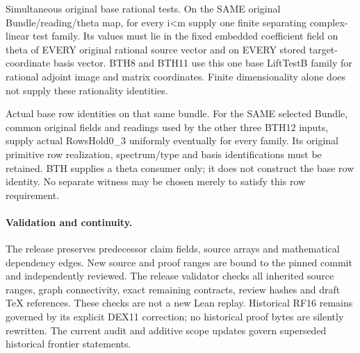 \begin{description}[style=nextline]
\item[34. BASE\_THETA\_RATIONAL\_TESTS --- C] Simultaneous original base rational tests. On the SAME original Bundle/reading/theta map, for every i<m supply one finite separating complex-linear test family. Its values must lie in the fixed embedded coefficient field on theta of EVERY original rational source vector and on EVERY stored target-coordinate basis vector. BTH8 and BTH11 use this one base LiftTestB family for rational adjoint image and matrix coordinates. Finite dimensionality alone does not supply these rationality identities.

\item[35. SLR\_BASE\_ROWS\_PRODUCER --- C] Actual base row identities on that same bundle. For the SAME selected Bundle, common original fields and readings used by the other three BTH12 inputs, supply actual RowsHold0\_3 uniformly eventually for every family. Its original primitive row realization, spectrum/type and basis identifications must be retained. BTH supplies a theta consumer only; it does not construct the base row identity. No separate witness may be chosen merely to satisfy this row requirement.

\end{description}

\paragraph{Validation and continuity.}
The release preserves predecessor claim fields, source arrays and
mathematical dependency edges. New source and proof ranges are bound
to the pinned commit and independently reviewed. The release
validator checks all inherited source ranges, graph connectivity,
exact remaining contracts, review hashes and draft TeX references.
These checks are not a new Lean replay. Historical RF16 remains
governed by its explicit DEX11 correction; no historical proof
bytes are silently rewritten. The current audit and additive scope
updates govern superseded historical frontier statements.
